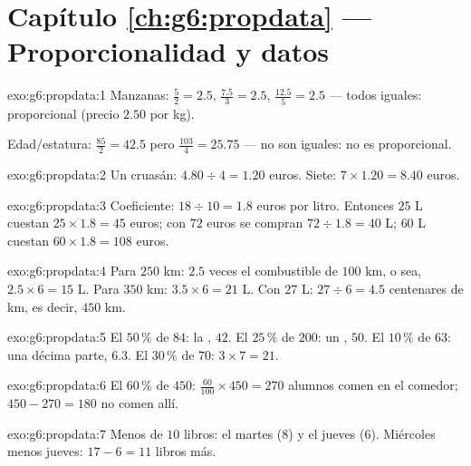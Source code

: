 \section*{Capítulo \ref{ch:g6:propdata} --- Proporcionalidad y datos}

\begin{solution}{exo:g6:propdata:1}
Manzanas:  $\frac52 = 2.5$, $\frac{7.5}{3} = 2.5$,
$\frac{12.5}{5} = 2.5$ --- todos iguales: proporcional (precio
$2.50$ por kg).

Edad/estatura: $\frac{85}{2} = 42.5$ pero $\frac{103}{4} = 25.75$ --- no son
iguales: no es proporcional.
\end{solution}

\begin{solution}{exo:g6:propdata:2}
Un cruasán: $4.80 \div 4 = 1.20$ euros. Siete:
$7 \times 1.20 = 8.40$ euros.
\end{solution}

\begin{solution}{exo:g6:propdata:3}
Coeficiente: $18 \div 10 = 1.8$ euros por litro. Entonces
$25$ L cuestan $25 \times 1.8 = 45$ euros; con $72$ euros se compran
$72 \div 1.8 = 40$ L; $60$ L cuestan $60 \times 1.8 = 108$ euros.
\end{solution}

\begin{solution}{exo:g6:propdata:4}
Para $250$ km: $2.5$ veces el combustible de $100$ km, o sea,
$2.5 \times 6 = 15$ L. Para $350$ km: $3.5 \times 6 = 21$ L. Con
$27$ L: $27 \div 6 = 4.5$ centenares de km, es decir, $450$ km.
\end{solution}

\begin{solution}{exo:g6:propdata:5}
El $50\,\%$ de $84$: la , $42$. \quad
El $25\,\%$ de $200$: un , $50$. \quad
El $10\,\%$ de $63$: una décima parte, $6.3$. \quad
El $30\,\%$ de $70$: $3 \times 7 = 21$.
\end{solution}

\begin{solution}{exo:g6:propdata:6}
El $60\,\%$ de $450$: $\frac{60}{100} \times 450 = 270$ alumnos comen en el
comedor; $450 - 270 = 180$ no comen allí.
\end{solution}

\begin{solution}{exo:g6:propdata:7}
Menos de $10$ libros: el martes ($8$) y el jueves ($6$). Miércoles
menos jueves: $17 - 6 = 11$ libros más.
\end{solution}

